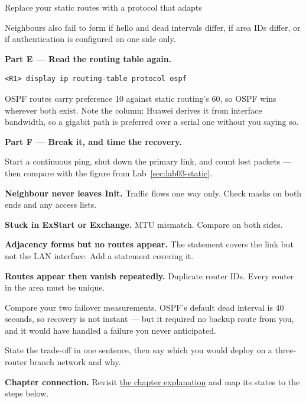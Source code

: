 \begin{labproject}{Replace your static routes with a protocol that adapts}
\begin{keyidea}
Neighbours also fail to form if hello and dead intervals differ, if area IDs differ, or if authentication is configured on one side only.
\end{keyidea}

\medskip\noindent\textbf{Part E --- Read the routing table again.}\par

\begin{lstlisting}[style=utpterminal]
<R1> display ip routing-table protocol ospf
\end{lstlisting}

OSPF routes carry preference 10 against static routing's 60, so OSPF wins wherever both exist. Note the  column: Huawei derives it from interface bandwidth, so a gigabit path is preferred over a serial one without you saying so.

\medskip\noindent\textbf{Part F --- Break it, and time the recovery.}\par
Start a continuous ping, shut down the primary link, and count lost packets --- then compare with the figure from Lab~\ref{sec:lab03-static}.

\begin{troubleshoot}
\textbf{Neighbour never leaves Init.} Traffic flows one way only. Check masks on both ends and any access lists.

\textbf{Stuck in ExStart or Exchange.} MTU mismatch. Compare  on both sides.

\textbf{Adjacency forms but no routes appear.} The  statement covers the link but not the LAN interface. Add a statement covering it.

\textbf{Routes appear then vanish repeatedly.} Duplicate router IDs. Every router in the area must be unique.
\end{troubleshoot}

\begin{tryit}
Compare your two failover measurements. OSPF's default dead interval is 40 seconds, so recovery is not instant --- but it required no backup route from you, and it would have handled a failure you never anticipated.

State the trade-off in one sentence, then say which you would deploy on a three-router branch network and why.
\end{tryit}
\end{labproject}

\textbf{Chapter connection.} Revisit \hyperref[ch:ospf]{the chapter explanation} and map its states to the steps below.


